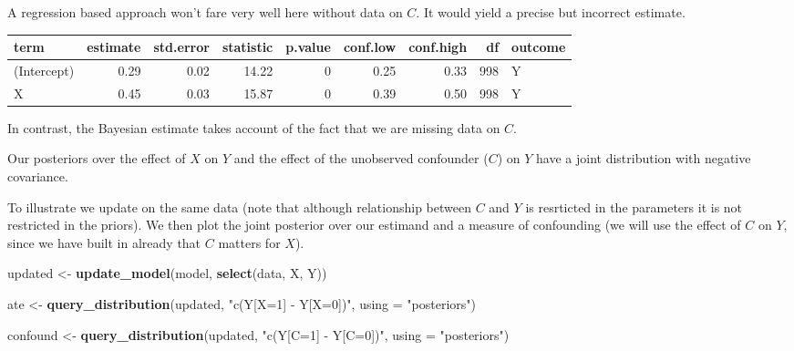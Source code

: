 \documentclass[
  12pt,
]{book}
\newenvironment{Shaded}{\begin{snugshade}}{\end{snugshade}}
\newcommand{\DataTypeTok}[1]{\textcolor[rgb]{0.13,0.29,0.53}{#1}}
\newcommand{\DecValTok}[1]{\textcolor[rgb]{0.00,0.00,0.81}{#1}}
\newcommand{\KeywordTok}[1]{\textcolor[rgb]{0.13,0.29,0.53}{\textbf{#1}}}
\newcommand{\NormalTok}[1]{#1}
\newcommand{\OperatorTok}[1]{\textcolor[rgb]{0.81,0.36,0.00}{\textbf{#1}}}
\newcommand{\StringTok}[1]{\textcolor[rgb]{0.31,0.60,0.02}{#1}}
\begin{document}
A regression based approach won't fare very well here without data on \(C\). It would yield a precise but incorrect estimate.

\begin{Shaded}
\end{Shaded}

\begin{tabular}{l|r|r|r|r|r|r|r|l}
\hline
term & estimate & std.error & statistic & p.value & conf.low & conf.high & df & outcome\\
\hline
(Intercept) & 0.29 & 0.02 & 14.22 & 0 & 0.25 & 0.33 & 998 & Y\\
\hline
X & 0.45 & 0.03 & 15.87 & 0 & 0.39 & 0.50 & 998 & Y\\
\hline
\end{tabular}

In contrast, the Bayesian estimate takes account of the fact that we are missing data on \(C\).

Our posteriors over the effect of \(X\) on \(Y\) and the effect of the unobserved confounder (\(C\)) on \(Y\) have a joint distribution with negative covariance.

To illustrate we update on the same data (note that although relationship between \(C\) and \(Y\) is resrticted in the parameters it is not restricted in the priors). We then plot the joint posterior over our estimand and a measure of confounding (we will use the effect of \(C\) on \(Y\), since we have built in already that \(C\) matters for \(X\)).

\begin{Shaded}
\begin{Highlighting}[]
\NormalTok{updated  <-}\StringTok{ }\KeywordTok{update_model}\NormalTok{(model, }\KeywordTok{select}\NormalTok{(data, X, Y))}

\NormalTok{ate <-}\StringTok{ }
\StringTok{  }\KeywordTok{query_distribution}\NormalTok{(updated, }\StringTok{"c(Y[X=1] - Y[X=0])"}\NormalTok{, }\DataTypeTok{using =} \StringTok{"posteriors"}\NormalTok{)}

\NormalTok{confound <-}\StringTok{ }
\StringTok{  }\KeywordTok{query_distribution}\NormalTok{(updated, }\StringTok{"c(Y[C=1] - Y[C=0])"}\NormalTok{, }\DataTypeTok{using =} \StringTok{"posteriors"}\NormalTok{)}
\end{Highlighting}
\end{Shaded}
\end{document}

